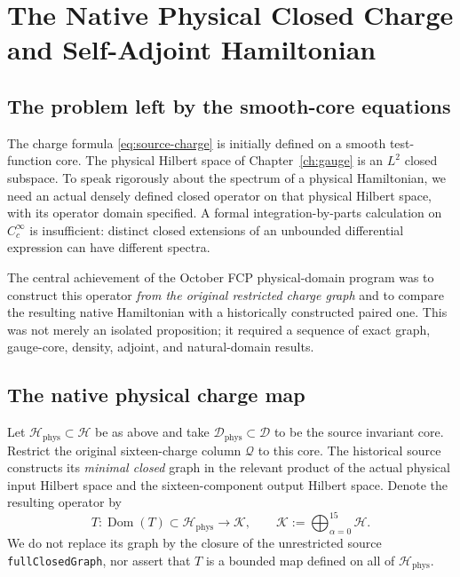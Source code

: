\chapter[Native Physical Hamiltonian]{The Native Physical Closed Charge and Self-Adjoint Hamiltonian}
\label{ch:hamiltonian}

\section{The problem left by the smooth-core equations}
The charge formula \eqref{eq:source-charge} is initially defined on a
smooth test-function core. The physical Hilbert space of
Chapter~\ref{ch:gauge} is an $L^2$ closed subspace. To speak rigorously
about the spectrum of a physical Hamiltonian, we need an actual densely
defined closed operator on that physical Hilbert space, with its
operator domain specified. A formal integration-by-parts calculation on
$C_c^\infty$ is insufficient: distinct closed extensions of an
unbounded differential expression can have different spectra.

The central achievement of the October FCP physical-domain program was to
construct this operator \emph{from the original restricted charge graph}
and to compare the resulting native Hamiltonian with a historically
constructed paired one. This was not merely an isolated proposition; it
required a sequence of exact graph, gauge-core, density, adjoint, and
natural-domain results.

\section{The native physical charge map}
Let $\mathscr H_{\mathrm{phys}}\subset\mathscr H$ be as above and take
$\mathscr D_{\mathrm{phys}}\subset\mathscr D$ to be the source
invariant core. Restrict the original sixteen-charge column
$\mathscr Q$ to this core. The historical source constructs its \emph{minimal
closed} graph in the relevant product of the actual physical input Hilbert
space and the sixteen-component output Hilbert space. Denote the
resulting operator by
\begin{equation}\label{eq:physical-T}
 T:\operatorname{Dom}(T)\subset\mathscr H_{\mathrm{phys}}
 \longrightarrow \mathscr K,
 \qquad \mathscr K:=\bigoplus_{\alpha=0}^{15}\mathscr H.
\end{equation}
We do not replace its graph by the closure of the unrestricted source
\texttt{fullClosedGraph}, nor assert that $T$ is a bounded map defined on
all of $\mathscr H_{\mathrm{phys}}$.

